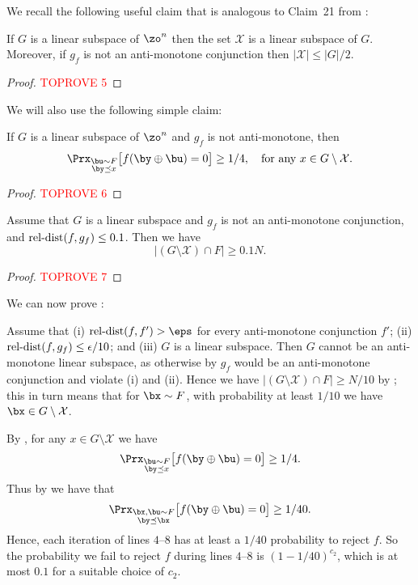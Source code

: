 \documentclass[11pt]{article}
\theoremstyle{definition}
\begin{document}
We recall the following useful claim that is analogous to Claim~21 from \cite{PRS02}:

\begin{claim} \label{lemma:PRS02} If $G$ is a {linear} subspace of $\zo^n$ then the set $\mathcal{X}$ is a {linear} subspace of $G$. Moreover, if $g_f$ is not an anti-monotone conjunction then $|\mathcal{X}|\leq  |G|/2$.
\end{claim} 
\begin{proof}\textcolor{red}{TOPROVE 5}\end{proof}










We will also use the following simple claim:
\begin{claim}\label{claim:yuv}
   If $G$ is a {linear} subspace of $\zo^n$ and $g_f$ is not anti-monotone, then 
$$\Prx_{\substack{\bu \sim F \\ \by \preceq x}}\big[f(\by \oplus \bu )=0\big] \geq 1/4,\quad\text{for any  $x \in {G} \setminus \mathcal{X}$.}$$
\end{claim}
\begin{proof}\textcolor{red}{TOPROVE 6}\end{proof}

\begin{lemma}\label{lem: f cap g is large}
   Assume that $G$ is a linear subspace and $g_f$ is not an anti-monotone conjunction, and $\mathrm{rel}\text{-}\mathrm{dist}(f,g_f) \leq 0.1$. Then we have$$\left|\left(G \setminus \mathcal{X}\right) \cap F\right| \geq 0.1N.$$
\end{lemma}
\begin{proof}\textcolor{red}{TOPROVE 7}\end{proof}

We can now prove :

\begin{proofof}{}
    Assume that (i) $\reldist(f,f') > \eps$  for every anti-monotone conjunction $f'$; (ii) $\mathrm{rel}\text{-}\mathrm{dist}(f,g_f) \leq \epsilon/10$; and (iii) $G$ is a linear subspace. Then $G$ cannot be an anti-monotone linear subspace, as otherwise by  $g_f$ would be an anti-monotone conjunction and violate (i) and (ii).
    Hence we have $|(G \setminus \mathcal{X} ) \cap F | \geq N/10$ by ; this in turn means that for $\bx \sim F$, with probability at least $1/10$ we have $\bx \in G \setminus \mathcal{X}$. 


    By , for any $x \in G \setminus \mathcal{X}$ we have 
$$\Prx_{\substack{ \bu \sim F \\ \by \preceq x}}\big[f(\by \oplus \bu )=0\big] \geq 1/4.$$
Thus by  we have that
$$\Prx_{\substack{\bx,\bu \sim F \\ \by \preceq \bx  }}\big[f(\by \oplus \bu )=0\big] \geq 1/40.$$
Hence, each iteration of lines $4$--$8$ has at least a  $1/40$ probability to reject $f$. So the probability we fail to reject $f$ during lines $4$--$8$ is $(1-1/40)^{c_2}$, which is
    at most $0.1$ for a suitable choice of $c_2$.
\end{proofof}
\end{document}
